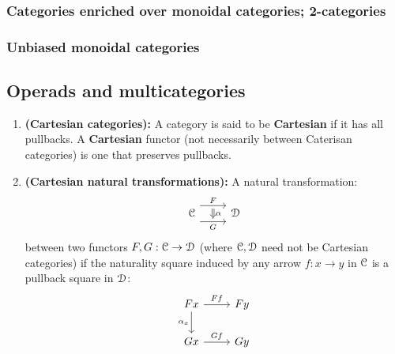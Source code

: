             \subsubsection{Categories enriched over monoidal categories; 2-categories}
            
            \subsubsection{Unbiased monoidal categories}
        
        \subsection{Operads and multicategories}
            \begin{definition} \label{def: cartesian_categories}
                \noindent
                \begin{enumerate}
                    \item \textbf{(Cartesian categories):} A category is said to be \textbf{Cartesian} if it has all pullbacks. A \textbf{Cartesian} functor (not necessarily between Caterisan categories) is one that preserves pullbacks. 
                    \item \textbf{(Cartesian natural transformations):} A natural transformation:
                        $$
                            \begin{tikzcd}
                            	\C & \D
                            	\arrow[""{name=0, anchor=center, inner sep=0}, "G"', shift right=3, from=1-1, to=1-2]
                            	\arrow[""{name=1, anchor=center, inner sep=0}, "F", shift left=3, from=1-1, to=1-2]
                            	\arrow["\alpha", shorten <=2pt, shorten >=2pt, Rightarrow, from=1, to=0]
                            \end{tikzcd}
                        $$
                    between two functors $F, G: \C \to \D$ (where $\C, \D$ need not be Cartesian categories) if the naturality square induced by any arrow $f: x \to y$ in $\C$ is a pullback square in $\D$:
                        $$
                            \begin{tikzcd}
                            	Fx & Fy \\
                            	Gx & Gy
                            	\arrow["Ff", from=1-1, to=1-2]
                            	\arrow["Gf", from=2-1, to=2-2]
                            	\arrow["{\alpha_x}"', from=1-1, to=2-1]

\end{tikzcd}$$
\end{enumerate}
\end{definition}
